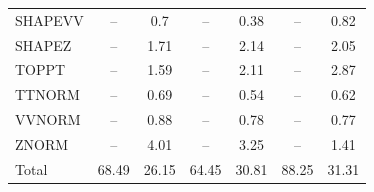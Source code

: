 \begin{table}[H]
\begin{center}
\begin{footnotesize}
\begin{tabular}{lcccccc}
				SHAPEVV & -- &  0.7 & -- &  0.38 & -- &  0.82 \\
				SHAPEZ & -- &  1.71 & -- &  2.14 & -- &  2.05 \\
				TOPPT & -- &  1.59 & -- &  2.11 & -- &  2.87 \\
				TTNORM & -- &  0.69 & -- &  0.54 & -- &  0.62 \\
				VVNORM & -- &  0.88 & -- &  0.78 & -- &  0.77 \\
				ZNORM & -- &  4.01 & -- &  3.25 & -- &  1.41 \\
				Total &  68.49  &  26.15 &  64.45  &  30.81 &  88.25  &  31.31 \\ \hline \hline
			\end{tabular}
			\label{tab:SysUncertainties_2200}
        \end{footnotesize}
	\end{center}
\end{table}


